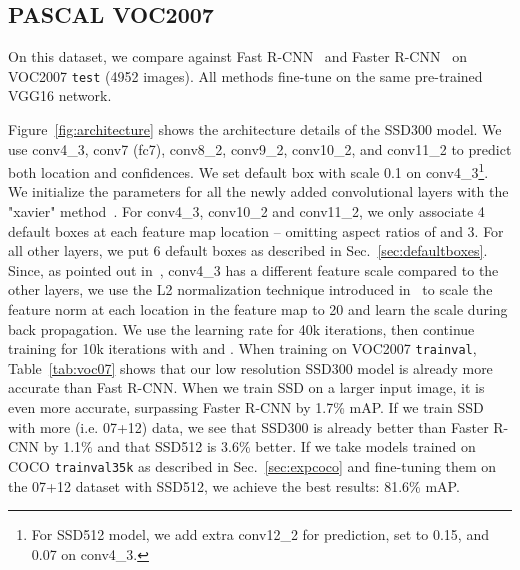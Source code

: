 \documentclass[runningheads]{llncs}
\begin{document}
\subsection{PASCAL VOC2007}
On this dataset, we compare against Fast R-CNN~\cite{girshick2015fast} and Faster R-CNN~\cite{ren2015faster} on VOC2007 \texttt{test} (4952 images). All methods fine-tune on the same pre-trained VGG16 network.

Figure~\ref{fig:architecture} shows the architecture details of the SSD300 model. We use conv4\_3, conv7 (fc7), conv8\_2, conv9\_2, conv10\_2, and conv11\_2 to predict both location and confidences. We set default box with scale 0.1 on conv4\_3\footnote{For SSD512 model, we add extra conv12\_2 for prediction, set  to 0.15, and 0.07 on conv4\_3.}. We initialize the parameters for all the newly added convolutional layers with the "xavier" method~\cite{glorot2010understanding}. For conv4\_3, conv10\_2 and conv11\_2, we only associate 4 default boxes at each feature map location -- omitting aspect ratios of  and 3. For all other layers, we put 6 default boxes as described in Sec.~\ref{sec:defaultboxes}. Since, as pointed out in~\cite{liu2015parsenet}, conv4\_3 has a different feature scale compared to the other layers, we use the L2 normalization technique introduced in~\cite{liu2015parsenet} to scale the feature norm at each location in the feature map to 20 and learn the scale during back propagation. We use the  learning rate for 40k iterations, then continue training for 10k iterations with  and . When training on VOC2007 \texttt{trainval}, Table~\ref{tab:voc07} shows that our low resolution SSD300 model is already more accurate than Fast R-CNN. When we train SSD on a larger  input image, it is even more accurate, surpassing Faster R-CNN by 1.7\% mAP. If we train SSD with more (i.e. 07+12) data, we see that SSD300 is already better than Faster R-CNN by 1.1\% and that SSD512 is 3.6\% better. If we take models trained on COCO \texttt{trainval35k} as described in Sec.~\ref{sec:expcoco} and fine-tuning them on the 07+12 dataset with SSD512, we achieve the best results: 81.6\% mAP.
\end{document}
